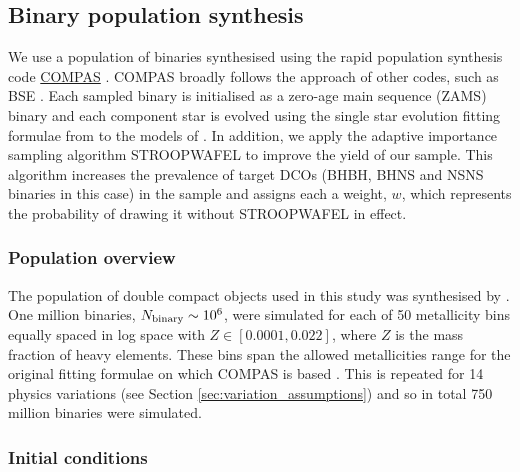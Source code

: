 \subsection{Binary population synthesis}\label{sec:COMPAS_explained}

We use a population of binaries synthesised using the rapid population synthesis code \href{https://compas.science}{COMPAS} \citep{Stevenson+2017, Vigna-Gomez+2018, Stevenson+2019}. COMPAS broadly follows the approach of other codes, such as BSE \citep{Hurley+2002}. Each sampled binary is initialised as a zero-age main sequence (ZAMS) binary and each component star is evolved using the single star evolution fitting formulae from \citet{Hurley+2000} to the models of \citet{Pols+1998}. In addition, we apply the adaptive importance sampling algorithm STROOPWAFEL \citep{Broekgaarden+2019} to improve the yield of our sample. This algorithm increases the prevalence of target DCOs (BHBH, BHNS and NSNS binaries in this case) in the sample and assigns each a weight, $w$, which represents the probability of drawing it without STROOPWAFEL in effect.

\subsubsection{Population overview}

The population of double compact objects used in this study was synthesised by \citet{Broekgaarden+2021}. One million binaries, $N_{\rm binary} \sim 10^6$, were simulated for each of 50 metallicity bins equally spaced in log space with $Z \in [0.0001, 0.022]$, where $Z$ is the mass fraction of heavy elements. These bins span the allowed metallicities range for the original fitting formulae on which COMPAS is based \citep{Hurley+2000}. This is repeated for 14 physics variations (see Section \ref{sec:variation_assumptions}) and so in total 750 million binaries were simulated.

\subsubsection{Initial conditions}

